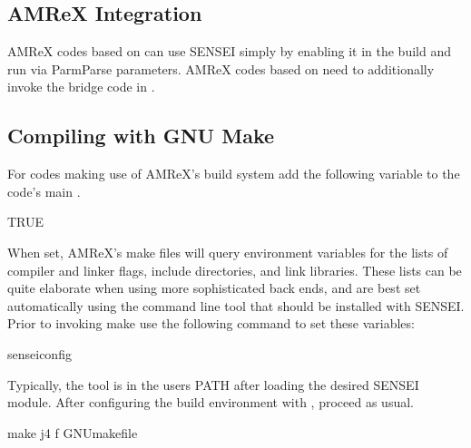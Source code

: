 \documentclass[letterpaper,10pt,english]{sphinxmanual}
\begin{document}
\subsection{AMReX Integration}
\label{\detokenize{Visualization:amrex-integration}}
\sphinxAtStartPar
AMReX codes based on  can use SENSEI simply by enabling it in
the build and run via ParmParse parameters.  AMReX codes based on
 need to additionally invoke the bridge code in
.


\subsection{Compiling with GNU Make}
\label{\detokenize{Visualization:compiling-with-gnu-make}}
\sphinxAtStartPar
For codes making use of AMReX’s build system add the following variable to the
code’s main .

\begin{sphinxVerbatim}[commandchars=\\\{\}]
  TRUE
\end{sphinxVerbatim}

\sphinxAtStartPar
When set, AMReX’s make files will query environment variables for the lists of
compiler and linker flags, include directories, and link libraries. These lists
can be quite elaborate when using more sophisticated back ends, and are best
set automatically using the  command line tool that should
be installed with SENSEI. Prior to invoking make use the following command to
set these variables:

\begin{sphinxVerbatim}[commandchars=\\\{\}]
 sensei\PYGZus{}config
\end{sphinxVerbatim}

\sphinxAtStartPar
Typically, the  tool is in the users PATH after loading
the desired SENSEI module. After configuring the build environment with
, proceed as usual.

\begin{sphinxVerbatim}[commandchars=\\\{\}]
make \PYGZhy{}j4 \PYGZhy{}f GNUmakefile
\end{sphinxVerbatim}
\end{document}
